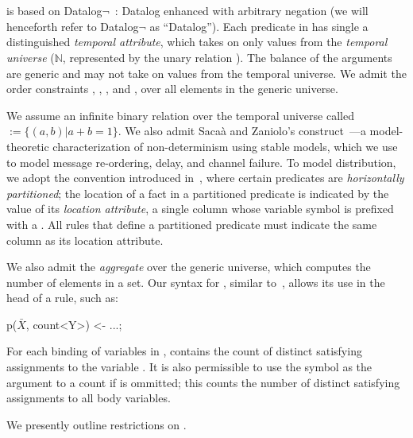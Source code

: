 \section{\large \bf \lang}
\label{sec:slang}

\lang is based on Datalog$\lnot$~\cite{ullmanbook}: Datalog enhanced with arbitrary negation (we will henceforth refer to Datalog$\lnot$ as ``Datalog'').  Each predicate in \lang has single a distinguished {\em temporal attribute}, which takes on only values from the {\em temporal universe} ($\mathbb{N}$, represented by the unary relation ). The balance of the arguments are generic and may not take on values from the temporal universe.  We admit the order constraints \dedalus{<}, \dedalus{=}, \dedalus{!=}, and \dedalus{<=}, over all elements in the generic universe.

We assume an infinite binary relation over the temporal universe called  $:= \{\left(a,b\right) | a + b = 1\}$.  We also admit Saca\`{a} and Zaniolo's  construct~\cite{sacaa-zaniolo}---a model-theoretic characterization of non-determinism using stable models, which we use to model message re-ordering, delay, and channel failure.  To model distribution, we adopt the convention introduced in~\cite{Loo:2005}, where certain predicates are {\em horizontally partitioned};  the location of a fact in a partitioned predicate is indicated by the value of its {\em location attribute}, a single column whose variable symbol is prefixed with a \dedalus{\#}.  All rules that define a partitioned predicate must indicate the same column as its location attribute.

We also admit the  {\em aggregate} over the generic universe, which computes the number of elements in a set.  Our syntax for , similar to~\cite{datalog-agg}, allows its use in the head of a rule, such as:

\begin{Dedalus}
p(\(\bar{X}\), count<Y>) <- ...;
\end{Dedalus}

For each binding of variables in ,  contains the count of distinct satisfying assignments to the variable .  It is also permissible to use the symbol \dedalus{*} as the argument to a count if  is ommitted; this counts the number of distinct satisfying assignments to all body variables.

We presently outline restrictions on \lang.

